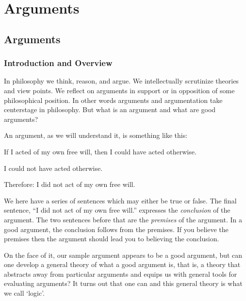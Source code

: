 \part{Arguments}
\label{ch.intro}


\chapter{Arguments}
\label{s:Arguments}
\section{Introduction and Overview}
In philosophy we think, reason, and argue. We intellectually scrutinize theories and view points. We reflect on arguments in support or in opposition of some philosophical position. In other words arguments and argumentation take centerstage in philosophy. But what is an argument and what are good arguments? 

An argument, as we will understand it, is something like this:
		\begin{ebullet}
	\item If I acted of my own free will, then I could have acted otherwise.
	\item I could not have acted otherwise.
	\item Therefore: I did not act of my own free will.
		\end{ebullet}
We here have a series of sentences which may either be true or false. The final sentence, ``I did not act of my own free will.'' expresses the \emph{conclusion} of the argument. The two sentences before that are the \emph{premises} of the argument. In a good argument, the conclusion follows from the premises. If you believe the premises then the argument should lead you to believing the conclusion.

On the face of it, our sample argument appears to be a good argument, but can one develop a general theory of what a good argument is, that is, a theory that abstracts away from particular arguments and equips us with general tools for evaluating arguments? It turns out that one can and this general theory is what we call `logic'.

